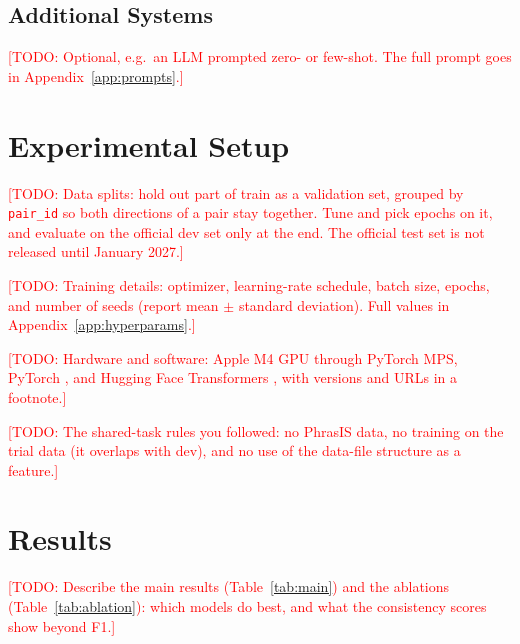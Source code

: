 \documentclass[11pt]{article}
\newcommand{\todo}[1]{\textcolor{red}{[TODO: #1]}}
\begin{document}
\subsection{Additional Systems}
\todo{Optional, e.g.\ an LLM prompted zero- or few-shot. The full prompt goes in Appendix~\ref{app:prompts}.}

\section{Experimental Setup}

\todo{Data splits: hold out part of train as a validation set, grouped by \texttt{pair\_id} so both directions of a pair stay together. Tune and pick epochs on it, and evaluate on the official dev set only at the end. The official test set is not released until January 2027.}

\todo{Training details: optimizer, learning-rate schedule, batch size, epochs, and number of seeds (report mean $\pm$ standard deviation). Full values in Appendix~\ref{app:hyperparams}.}

\todo{Hardware and software: Apple M4 GPU through PyTorch MPS, PyTorch \citep{paszke2019pytorch}, and Hugging Face Transformers \citep{wolf-etal-2020-transformers}, with versions and URLs in a footnote.}

\todo{The shared-task rules you followed: no PhrasIS data, no training on the trial data (it overlaps with dev), and no use of the data-file structure as a feature.}

\section{Results}

\todo{Describe the main results (Table~\ref{tab:main}) and the ablations (Table~\ref{tab:ablation}): which models do best, and what the consistency scores show beyond F1.}
\end{document}
